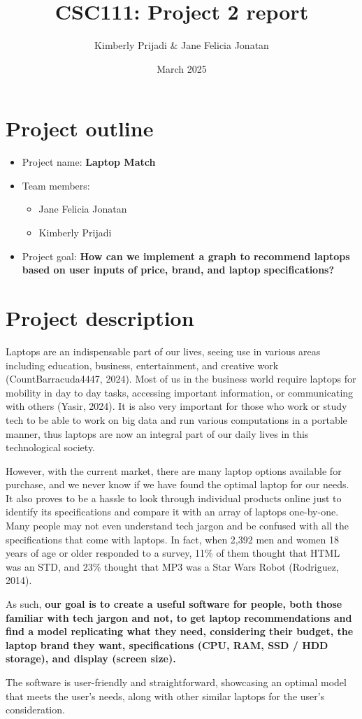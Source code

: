 \documentclass{article}
\title{CSC111: Project 2 report}
\author{Kimberly Prijadi & Jane Felicia Jonatan}
\date{March 2025}
\begin{document}
\maketitle

\section{Project outline}
\begin{itemize}
    \item Project name: \textbf{Laptop Match}
    \item Team members:
    \begin{itemize}
        \item Jane Felicia Jonatan
        \item Kimberly Prijadi
    \end{itemize}
    \item Project goal: \textbf{How can we implement a graph to recommend laptops based on user inputs of price, brand, and laptop specifications?}
\end{itemize}


\section{Project description}
\par Laptops are an indispensable part of our lives, seeing use in various areas including education, business, entertainment, and creative work (CountBarracuda4447, 2024). Most of us in the business world require laptops for mobility in day to day tasks, accessing important information, or communicating with others (Yasir, 2024). It is also very important for those who work or study tech to be able to work on big data and run various computations in a portable manner, thus laptops are now an integral part of our daily lives in this technological society. 
\\
\par However, with the current market, there are many laptop options available for purchase, and we never know if we have found the optimal laptop for our needs. It also proves to be a hassle to look through individual products online just to identify its specifications and compare it with an array of laptops one-by-one. Many people may not even understand tech jargon and be confused with all the specifications that come with laptops. In fact, when 2,392 men and women 18 years of age or older responded to a survey, 11\% of them thought that HTML was an STD, and 23\% thought that MP3 was a Star Wars Robot (Rodriguez, 2014).
\\
\par
As such, \textbf{our goal is to create a useful software for people, both those familiar with tech jargon and not, to get laptop recommendations and find a model replicating what they need, considering their budget, the laptop brand they want, specifications (CPU, RAM, SSD / HDD storage), and display (screen size).}
\\
\par 
The software is user-friendly and straightforward, showcasing an optimal model that meets the user’s needs, along with other similar laptops for the user's consideration. 
\end{document}

